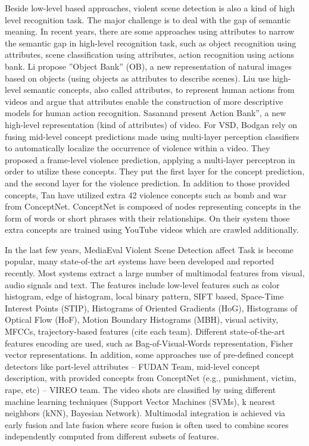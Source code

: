 \documentclass[review]{elsarticle}
\begin{document}
Beside low-level based approaches, violent scene detection is also a kind of high level recognition task. The major challenge is to deal with the gap of semantic meaning. In recent years, there are some approaches using attributes to narrow the semantic gap in high-level recognition task, such as object recognition using attributes, scene classification using attributes, action recognition using actions bank\cite{23}. Li \cite{15} propose ”Object Bank” (OB), a new representation of natural images based on objects (using objects as attributes to describe scenes). Liu \cite{18} use high-level semantic concepts, also called attributes, to represent human actions from videos and argue that attributes enable the construction of more descriptive models for human action recognition. Sasanand \cite{23} present Action Bank”, a new high-level representation (kind of attributes) of video.  For VSD, Bodgan \cite{13} rely on fusing mid-level concept predictions made using multi-layer perception classifiers to automatically localize the occurrence of violence within a video.  They proposed a frame-level violence prediction, applying a multi-layer perceptron in order to utilize these concepts. They put the first layer for the concept prediction, and the second layer for the violence prediction. In addition to those provided concepts, Tan \cite{tan2013vireo} have utilized extra 42 violence concepts such as bomb and war from ConceptNet\cite{liu2004conceptnet}. ConceptNet is composed of nodes representing concepts in the form of words or short phrases with their relationships. On their system those extra concepts are trained using YouTube videos which are crawled additionally. 

In the last few years, MediaEval Violent Scene Detection affect Task is become popular, many state-of-the art systems have been developed and reported recently\cite{demarty2014benchmarking}. Most systems extract a large number of multimodal features from visual, audio signals and text.  The features include low-level features such as color histogram, edge of histogram, local binary pattern, SIFT based, Space-Time Interest Points (STIP), Histograms of Oriented Gradients (HoG), Histograms of Optical Flow (HoF), Motion Boundary Histograms (MBH), visual activity, MFCCs, trajectory-based features  (cite each team). Different state-of-the-art features encoding are used, such as Bag-of-Visual-Words representation, Fisher vector representations. In addition, some approaches use of pre-defined concept detectors like part-level attributes – FUDAN Team\cite{dai2013fudan}, mid-level concept description, with provided concepts from ConceptNet (e.g., punishment, victim, rape, etc) – VIREO team\cite{tan2013vireo}. The video shots are classified by using different machine learning techniques (Support Vector Machines (SVMs), k nearest neighbors (kNN), Bayesian Network). Multimodal integration is achieved via early fusion\cite{penet2013technicolor}  and late fusion\cite{penet2013technicolor,sjoberg2013far,derbas2013lig,dai2013fudan} where score fusion is often used to combine scores independently computed from different subsets of features.
\end{document}
